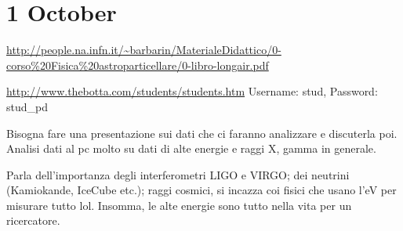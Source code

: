 \documentclass[main.tex]{subfiles}
\begin{document}
\section*{1 October}

\url{http://people.na.infn.it/~barbarin/MaterialeDidattico/0-corso%20Fisica%20astroparticellare/0-libro-longair.pdf}

\url{http://www.thebotta.com/students/students.htm}
Username: stud, Password: stud\_pd

Bisogna fare una presentazione sui dati che ci faranno analizzare e discuterla poi. Analisi dati al pc molto su dati di alte energie e raggi X, gamma in generale.

Parla dell'importanza degli interferometri LIGO e VIRGO; dei neutrini (Kamiokande, IceCube etc.); raggi cosmici, si incazza coi fisici che usano l'eV per misurare tutto lol. Insomma, le alte energie sono tutto nella vita per un ricercatore.
\end{document}
